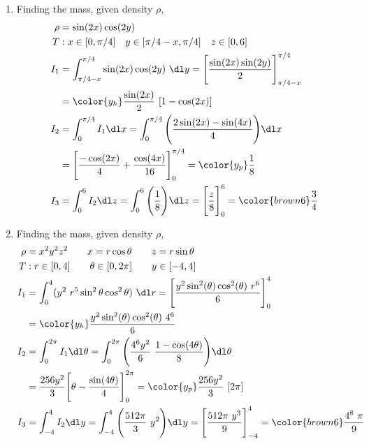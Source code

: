 \begin{enumerate}
     \item Finding the mass, given density $ \rho $,
           \begin{align}
                \rho & = \sin(2x)\cos(2y)                                      \\
                T    & : x \in [0, \pi/4] \quad y \in [\pi/4 - x, \pi/4]
                \quad z \in [0, 6]                                             \\
                I_1  & = \int_{\pi/4 - x}^{\pi/4} \sin(2x) \cos(2y)\ \dl y
                = \Bigg[ \frac{\sin(2x)\sin(2y)}{2} \Bigg]_{\pi/4 - x}^{\pi/4} \\
                     & = {\color{y_h} \frac{\sin(2x)}{2}\ [1 - \cos(2x)]}      \\
                I_2  & = \int_{0}^{\pi/4}I_1 \dl x = \int_{0}^{\pi/4}
                \Bigg( \frac{2\sin(2x) - \sin(4x)}{4} \Bigg) \dl x             \\
                     & = \Bigg[ \frac{-\cos(2x)}{4} + \frac{\cos(4x)}{16}
                     \Bigg]_{0}^{\pi/4}
                = {\color{y_p} \frac{1}{8} }                                   \\
                I_3  & = \int_{0}^{6} I_2 \dl z = \int_{0}^{6}
                \Bigg( \frac{1}{8} \Bigg) \dl z
                = \Bigg[ \frac{z}{8} \Bigg]_0^6
                = {\color{brown6} \frac{3}{4}}
           \end{align}

     \item Finding the mass, given density $ \rho $,
           \begin{align}
                \rho & = x^2y^2z^2 \qquad x = r\cos \theta \qquad z = r\sin \theta     \\
                T    & : r \in [0, 4] \qquad \theta \in [0, 2\pi]
                \qquad y \in [-4, 4]                                                   \\
                I_1  & = \int_{0}^{4} (y^2\ r^5 \sin^2 \theta \cos^2 \theta)
                \ \dl r
                = \Bigg[ \frac{y^2 \sin^2 (\theta) \cos^2 (\theta)\ r^6}{6}
                \Bigg]_{0}^{4}                                                         \\
                     & = {\color{y_h} \frac{y^2 \sin^2(\theta)\cos^2(\theta)\ 4^6}{6}} \\
                I_2  & = \int_{0}^{2\pi}I_1 \dl \theta = \int_{0}^{2\pi}
                \Bigg( \frac{4^6y^2}{6}\ \frac{1 - \cos(4\theta)}{8} \Bigg) \dl \theta \\
                     & = \frac{256y^2}{3}\Bigg[ \theta - \frac{\sin(4\theta)}{4}
                     \Bigg]_{0}^{2\pi}
                = {\color{y_p} \frac{256y^2}{3}\ [2\pi] }                              \\
                I_3  & = \int_{-4}^{4} I_2 \dl y = \int_{-4}^{4}
                \Bigg( \frac{512\pi}{3}\ y^2 \Bigg) \dl y
                = \Bigg[ \frac{512\pi\ y^3}{9} \Bigg]_{-4}^{4}
                = {\color{brown6} \frac{4^8\ \pi}{9}}
           \end{align}


\end{enumerate}
